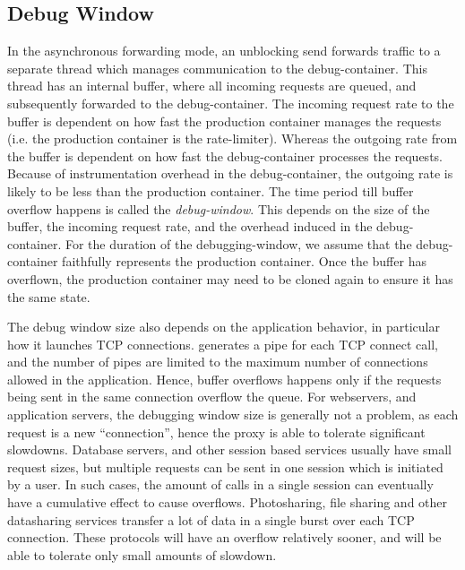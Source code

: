 
\subsection{Debug Window}
\label{sec:window}

In the asynchronous forwarding mode, an unblocking send forwards traffic to a separate thread which manages communication to the debug-container. 
This thread has an internal buffer, where all incoming requests are queued, and subsequently forwarded to the debug-container. 
The incoming request rate to the buffer is dependent on how fast the production container manages the requests (i.e. the production container is the rate-limiter).
Whereas the outgoing rate from the buffer is dependent on how fast the debug-container processes the requests.
Because of instrumentation overhead in the debug-container, the outgoing rate is likely to be less than the production container.
The time period till buffer overflow happens is called the \emph{debug-window}.
This depends on the size of the buffer, the incoming request rate, and the overhead induced in the debug-container. 
For the duration of the debugging-window, we assume that the debug-container faithfully represents the production container. 
Once the buffer has overflown, the production container may need to be cloned again to ensure it has the same state.

The debug window size also depends on the application behavior, in particular how it launches TCP connections. 
\parikshan generates a pipe for each TCP connect call, and the number of pipes are limited to the maximum number of connections allowed in the application.
Hence, buffer overflows happens only if the requests being sent in the same connection overflow the queue.
For webservers, and application servers, the debugging window size is generally not a problem, as each request is a new ``connection'', hence the proxy is able to tolerate significant slowdowns.
Database servers, and other session based services usually have small request sizes, but multiple requests can be sent in one session which is initiated by a user. 
In such cases, the amount of calls in a single session can eventually have a cumulative effect to cause overflows.
Photosharing, file sharing and other datasharing services transfer a lot of data in a single burst over each TCP connection. 
These protocols will have an overflow relatively sooner, and will be able to tolerate only small amounts of slowdown. 

